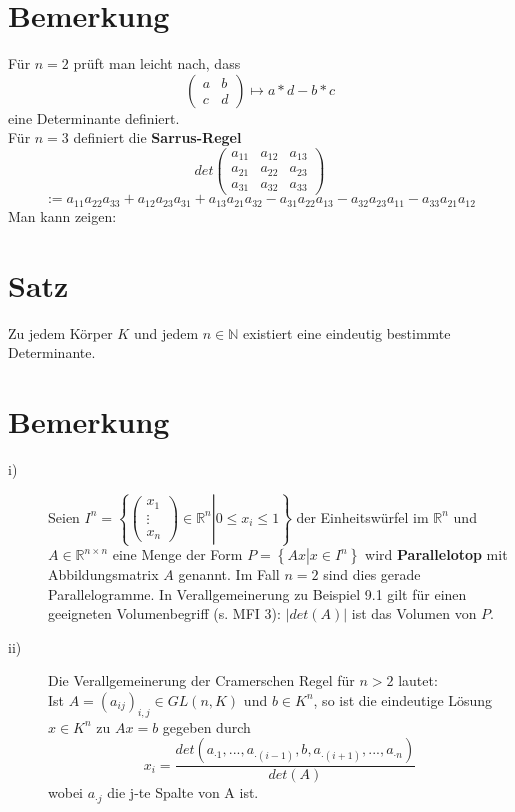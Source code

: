 \documentclass{scrbook}
\begin{document}
\section{Bemerkung}
Für $n=2$ prüft man leicht nach, dass \[\left(
\begin{array}{cc}
a&b\\c&d
\end{array}
\right) \mapsto a*d-b*c\] eine Determinante definiert.\\
Für $n=3$ definiert die \textbf{Sarrus-Regel}
\[det\left(
\begin{array}{ccc}
a_{11}&a_{12}&a_{13}\\
a_{21}&a_{22}&a_{23}\\
a_{31}&a_{32}&a_{33}
\end{array}
\right)\]\[:= a_{11}a_{22}a_{33}+a_{12}a_{23}a_{31}+a_{13}a_{21}a_{32}-a_{31}a_{22}a_{13}-a_{32}a_{23}a_{11}-a_{33}a_{21}a_{12}\]
Man kann zeigen:
\section{Satz}
Zu jedem Körper $K$ und jedem $n\in \mathbb{N}$ existiert eine eindeutig bestimmte Determinante.
\section{Bemerkung}
\begin{description}
\item[i)] Seien $I^n=\left\{\left.
\left(
\begin{array}{c}
x_1\\\vdots\\x_n
\end{array}
\right)\in \mathbb{R}^n \right|0\leq x_i \leq 1
\right\}$ der Einheitswürfel im $\mathbb{R}^n$ und $A\in \mathbb{R}^{n \times n}$ eine Menge der Form $P=\left\{ Ax\left|x\in I^n \right.\right\}$ wird \textbf{Parallelotop} mit Abbildungsmatrix $A$ genannt. Im Fall $n=2$ sind dies gerade Parallelogramme. In Verallgemeinerung zu Beispiel 9.1 gilt für einen geeigneten Volumenbegriff (s. MFI 3): $|det(A)|$ ist das Volumen von $P$.
\item[ii)] Die Verallgemeinerung der Cramerschen Regel für $n>2$ lautet:\\
Ist $A=(a_{ij})_{i,j} \in GL(n,K)$ und $b\in K^n$, so ist die eindeutige Lösung $x\in K^n$ zu $Ax=b$ gegeben durch
\[x_i = \frac{det(a_{\cdot 1},...,a_{\cdot(i-1)},b,a_{\cdot(i+1)},...,a_{\cdot n})}{det(A)}\]
wobei $a_{\cdot j}$ die j-te Spalte von A ist.
\end{description}
\end{document}
